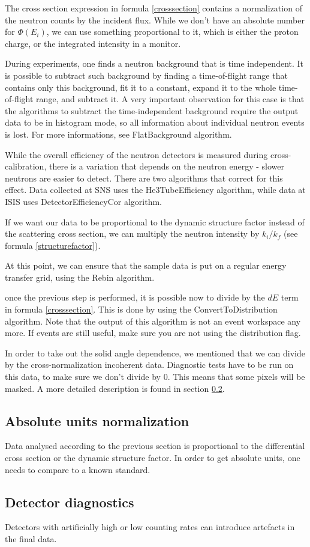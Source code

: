 The cross section expression in formula \ref{crosssection} contains a normalization of the neutron counts by the incident flux. While we don't have an absolute number for $\Phi(E_i)$, we can use something proportional to it, which is either the proton charge,  or the integrated intensity in a monitor.

During experiments, one finds a neutron background that is time independent. It is possible to subtract such background by finding a time-of-flight range that contains only this background, fit it to a constant, expand it to the whole time-of-flight range, and subtract it. A very important observation for this case is that the algorithms to subtract the time-independent background require the output data to be in histogram mode, so all information about individual neutron events is lost. For more informations, see FlatBackground algorithm.

While the overall efficiency of the neutron detectors is measured during cross-calibration, there is a variation that depends on the neutron energy - slower neutrons are easier to detect. There are two algorithms that correct for this effect. Data collected at SNS uses the He3TubeEfficiency algorithm, while data at ISIS uses  DetectorEfficiencyCor algorithm.

If we want our data to be proportional to the dynamic structure factor instead of the scattering cross section, we can multiply the neutron intensity by $k_i/k_f$ (see formula \ref{structurefactor}). 

At this point, we can ensure that the sample data is put on a regular energy transfer grid, using the Rebin algorithm.

once the previous step is performed, it is possible now to divide by the $dE$ term in formula \ref{crosssection}. This is done by using the ConvertToDistribution algorithm. Note that the output of this algorithm is not an event workspace any more. If events are still useful, make sure you are not using the distribution flag. 

In order to take out the solid angle dependence, we mentioned that we can divide by the cross-normalization incoherent data. Diagnostic tests have to be run on this data, to make sure we don't divide by 0. This means that some pixels will be masked. A more detailed description is found in section \ref{detdiag}. 

 
\subsection{Absolute units normalization}
Data analysed according to the previous section is proportional to the differential cross section or the dynamic structure factor. In order to get absolute units, one needs to compare to a known standard.
\subsection{Detector diagnostics}\label{detdiag}
Detectors with artificially high or low counting rates can introduce artefacts in the final data.